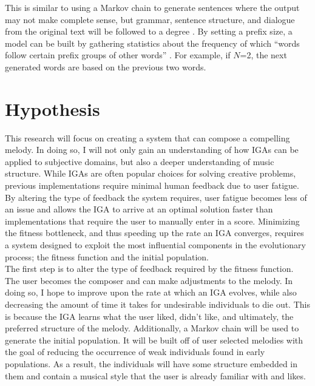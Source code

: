 \documentclass[12pt]{article} %
\begin{document}
This is similar to using a Markov chain to generate sentences where the output may not make complete sense, but grammar, sentence structure, and dialogue from the original text will be followed to a degree \cite{website:rose}. By setting a prefix size, a model can be built by gathering statistics about the frequency of which “words follow certain prefix groups of other words” \cite{website:rose}. For example, if $N$=2, the next generated words are based on the previous two words.

\section{Hypothesis}
This research will focus on creating a system that can compose a compelling melody. In doing so, I will not only gain an understanding of how IGAs can be applied to subjective domains, but also a deeper understanding of music structure. While IGAs are often popular choices for solving creative problems, previous implementations require minimal human feedback due to  user fatigue. By altering the type of feedback the system requires, user fatigue becomes less of an issue and allows the IGA to arrive at an optimal solution faster than implementations that require the user to manually enter in a score. Minimizing the fitness bottleneck, and thus speeding up the rate an IGA converges, requires a system designed to exploit the most influential components in the evolutionary process; the fitness function and the initial population. \\

The first step is to alter the type of feedback required by the fitness function. The user becomes the composer and can make adjustments to the melody. In doing so, I hope to improve upon the rate at which an IGA evolves, while also decreasing the amount of time it takes for undesirable individuals to die out. This is because the IGA learns what the user liked, didn't like, and ultimately, the preferred structure of the melody. Additionally, a Markov chain will be used to generate the initial population. It will be built off of user selected melodies with the goal of reducing the occurrence of weak individuals found in early populations. As a result, the individuals will have some structure embedded in them and contain a musical style that the user is already familiar with and likes. \\
\end{document}
